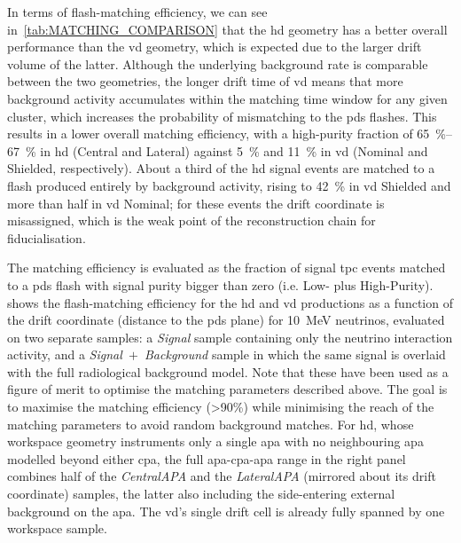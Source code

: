 \begin{table}[ht!]
    \centering
    
    \caption[width=1\linewidth]{TPC-PDS matching comparison between geometries for the \qtyrange{4}{30}{\mega\electronvolt} neutrino sample, showing the sample fraction for each type of flash-matching case. $^\dagger$Signal-only samples without background (earlier production), shown for reference.\label{tab:MATCHING_COMPARISON}}
\end{table}

In terms of flash-matching efficiency, we can see in~\cref{tab:MATCHING_COMPARISON} that the \gls{hd} geometry has a better overall performance than the \gls{vd} geometry, which is expected due to the larger drift volume of the latter. Although the underlying background rate is comparable between the two geometries, the longer drift time of \gls{vd} means that more background activity accumulates within the matching time window for any given cluster, which increases the probability of mismatching to the \gls{pds} flashes. This results in a lower overall matching efficiency, with a high-purity fraction of \SIrange{65}{67}{\percent} in \gls{hd} (Central and Lateral) against \SI{5}{\percent} and \SI{11}{\percent} in \gls{vd} (Nominal and Shielded, respectively). About a third of the \gls{hd} signal events are matched to a flash produced entirely by background activity, rising to \SI{42}{\percent} in \gls{vd} Shielded and more than half in \gls{vd} Nominal; for these events the drift coordinate is misassigned, which is the weak point of the reconstruction chain for fiducialisation.

The matching efficiency is evaluated as the fraction of signal \gls{tpc} events matched to a \gls{pds} flash with signal purity bigger than zero (i.e. Low- plus High-Purity).  shows the flash-matching efficiency for the \gls{hd} and \gls{vd} productions as a function of the drift coordinate (distance to the \gls{pds} plane) for \SI{10}{\mega\electronvolt} neutrinos, evaluated on two separate samples: a \emph{Signal} sample containing only the neutrino interaction activity, and a \emph{Signal~$+$~Background} sample in which the same signal is overlaid with the full radiological background model. Note that these have been used as a figure of merit to optimise the matching parameters described above. The goal is to maximise the matching efficiency (\num{>90}\%) while minimising the reach of the matching parameters to avoid random background matches. For \gls{hd}, whose workspace geometry instruments only a single \gls{apa} with no neighbouring \gls{apa} modelled beyond either \gls{cpa}, the full \gls{apa}-\gls{cpa}-\gls{apa} range in the right panel combines half of the \emph{CentralAPA} and the \emph{LateralAPA} (mirrored about its drift coordinate) samples, the latter also including the side-entering external background on the \gls{apa}. The \gls{vd}'s single drift cell is already fully spanned by one workspace sample.

